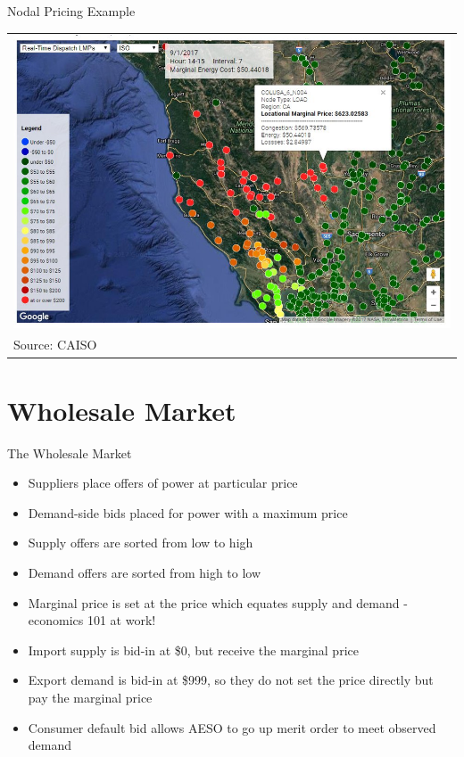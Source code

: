 \documentclass{beamer}
\renewcommand{\(}{\begin{columns}}
\renewcommand{\)}{\end{columns}}
\newcommand{\<}[1]{\begin{column}{#1}}
\renewcommand{\>}{\end{column}}
\begin{document}
\begin{frame}{Nodal Pricing Example}

\begin{tabular}{p{\linewidth}}
    \centering
    \includegraphics[width=\linewidth]{../images/cali_nodes.png} \\[.1\abovecaptionskip]
  Source: CAISO
\end{tabular}
\vfill
\end{frame}

\section{Wholesale Market}

\begin{frame}{The Wholesale Market}
\begin{itemize}
\setlength\itemsep{2em}
\item Suppliers place offers of power at particular price
\item Demand-side bids placed for power with a maximum price
\item Supply offers are sorted from low to high
\item Demand offers are sorted from high to low
\item Marginal price is set at the price which equates supply and demand - economics 101 at work!
\item Import supply is bid-in at \$0, but receive the marginal price
\item Export demand is bid-in at \$999, so they do not set the price directly but pay the marginal price
\item Consumer default bid allows AESO to go up merit order to meet observed demand
\end{itemize}

\vfill \end{frame}
\end{document}

